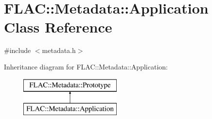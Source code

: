 \hypertarget{class_f_l_a_c_1_1_metadata_1_1_application}{}\section{F\+L\+AC\+:\+:Metadata\+:\+:Application Class Reference}
\label{class_f_l_a_c_1_1_metadata_1_1_application}


{\ttfamily \#include $<$metadata.\+h$>$}

Inheritance diagram for F\+L\+AC\+:\+:Metadata\+:\+:Application\+:\begin{figure}[H]
\begin{center}
\leavevmode
\includegraphics[height=2.000000cm]{class_f_l_a_c_1_1_metadata_1_1_application}
\end{center}
\end{figure}

